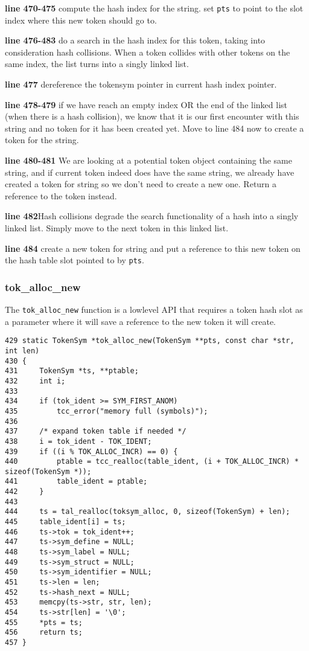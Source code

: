 \begin{tcc_desc}
\textbf{line 470-475} compute the hash index for the string. set \verb|pts| to point to the slot index where this new token should go to.

\textbf{line 476-483} do a search in the hash index for this token, taking into consideration hash collisions. When a token collides with other tokens on the same index, the list turns into a singly linked list.

\textbf{line 477} dereference the tokensym pointer in current hash index pointer.

\textbf{line 478-479} if we have reach an empty index OR the end of the linked list (when there is a hash collision), we know that it is our first encounter with this string and no token for it has been created yet. Move to line 484 now to create a token for the string.

\textbf{line 480-481} We are looking at a potential token object containing the same string, and if current token indeed does have the same string, we already have created a token for string so we don't need to create a new one. Return a reference to the token instead.

\textbf{line 482}Hash collisions degrade the search functionality of a hash into a singly linked list. Simply move to the next token in this linked list. 

\textbf{line 484} create a new token for string and put a reference to this new token on the hash table slot pointed to by \verb|pts|.
\end{tcc_desc}

\subsubsection{tok\_alloc\_new}

The \verb|tok_alloc_new| function is a lowlevel API that requires a token hash slot as a parameter where it will save a reference to the new token it will create.

\begin{verbatim}
429 static TokenSym *tok_alloc_new(TokenSym **pts, const char *str, int len)
430 {
431     TokenSym *ts, **ptable;
432     int i;
433
434     if (tok_ident >= SYM_FIRST_ANOM) 
435         tcc_error("memory full (symbols)");
436
437     /* expand token table if needed */
438     i = tok_ident - TOK_IDENT;
439     if ((i % TOK_ALLOC_INCR) == 0) {
440         ptable = tcc_realloc(table_ident, (i + TOK_ALLOC_INCR) * sizeof(TokenSym *));
441         table_ident = ptable;
442     }
443
444     ts = tal_realloc(toksym_alloc, 0, sizeof(TokenSym) + len);
445     table_ident[i] = ts;
446     ts->tok = tok_ident++;
447     ts->sym_define = NULL;
448     ts->sym_label = NULL;
449     ts->sym_struct = NULL;
450     ts->sym_identifier = NULL;
451     ts->len = len;
452     ts->hash_next = NULL;
453     memcpy(ts->str, str, len);
454     ts->str[len] = '\0';
455     *pts = ts;
456     return ts;
457 }
\end{verbatim}

